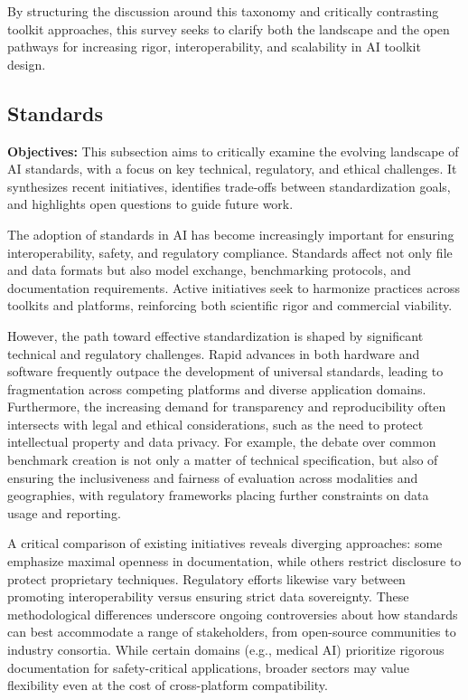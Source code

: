 \documentclass[sigconf]{acmart}
\begin{document}
By structuring the discussion around this taxonomy and critically contrasting toolkit approaches, this survey seeks to clarify both the landscape and the open pathways for increasing rigor, interoperability, and scalability in AI toolkit design.

\subsection{Standards}
\textbf{Objectives:} This subsection aims to critically examine the evolving landscape of AI standards, with a focus on key technical, regulatory, and ethical challenges. It synthesizes recent initiatives, identifies trade-offs between standardization goals, and highlights open questions to guide future work.

The adoption of standards in AI has become increasingly important for ensuring interoperability, safety, and regulatory compliance. Standards affect not only file and data formats but also model exchange, benchmarking protocols, and documentation requirements. Active initiatives seek to harmonize practices across toolkits and platforms, reinforcing both scientific rigor and commercial viability.

However, the path toward effective standardization is shaped by significant technical and regulatory challenges. Rapid advances in both hardware and software frequently outpace the development of universal standards, leading to fragmentation across competing platforms and diverse application domains. Furthermore, the increasing demand for transparency and reproducibility often intersects with legal and ethical considerations, such as the need to protect intellectual property and data privacy. For example, the debate over common benchmark creation is not only a matter of technical specification, but also of ensuring the inclusiveness and fairness of evaluation across modalities and geographies, with regulatory frameworks placing further constraints on data usage and reporting.

A critical comparison of existing initiatives reveals diverging approaches: some emphasize maximal openness in documentation, while others restrict disclosure to protect proprietary techniques. Regulatory efforts likewise vary between promoting interoperability versus ensuring strict data sovereignty. These methodological differences underscore ongoing controversies about how standards can best accommodate a range of stakeholders, from open-source communities to industry consortia. While certain domains (e.g., medical AI) prioritize rigorous documentation for safety-critical applications, broader sectors may value flexibility even at the cost of cross-platform compatibility.
\end{document}
